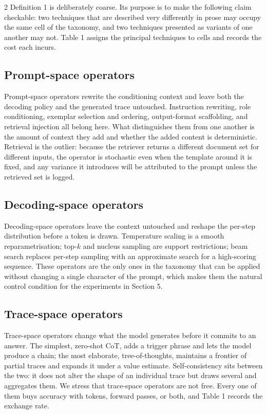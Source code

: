 \documentclass{article}
\begin{document}
\begin{multicols}{2}
Definition 1 is deliberately coarse. Its purpose is to make the following claim checkable: two techniques that are described very differently in prose may occupy the same cell of the taxonomy, and two techniques presented as variants of one another may not. Table 1 assigns the principal techniques to cells and records the cost each incurs.

\subsection{Prompt-space operators}

Prompt-space operators rewrite the conditioning context and leave both the decoding policy and the generated trace untouched. Instruction rewriting, role conditioning, exemplar selection and ordering, output-format scaffolding, and retrieval injection all belong here. What distinguishes them from one another is the amount of context they add and whether the added content is deterministic. Retrieval is the outlier: because the retriever returns a different document set for different inputs, the operator is stochastic even when the template around it is fixed, and any variance it introduces will be attributed to the prompt unless the retrieved set is logged.

\subsection{Decoding-space operators}

Decoding-space operators leave the context untouched and reshape the per-step distribution before a token is drawn. Temperature scaling is a smooth reparametrisation; top-$k$ and nucleus sampling are support restrictions; beam search replaces per-step sampling with an approximate search for a high-scoring sequence. These operators are the only ones in the taxonomy that can be applied without changing a single character of the prompt, which makes them the natural control condition for the experiments in Section 5.

\subsection{Trace-space operators}

Trace-space operators change what the model generates before it commits to an answer. The simplest, zero-shot CoT, adds a trigger phrase and lets the model produce a chain; the most elaborate, tree-of-thoughts, maintains a frontier of partial traces and expands it under a value estimate. Self-consistency sits between the two: it does not alter the shape of an individual trace but draws several and aggregates them. We stress that trace-space operators are not free. Every one of them buys accuracy with tokens, forward passes, or both, and Table 1 records the exchange rate.


\end{multicols}
\end{document}

